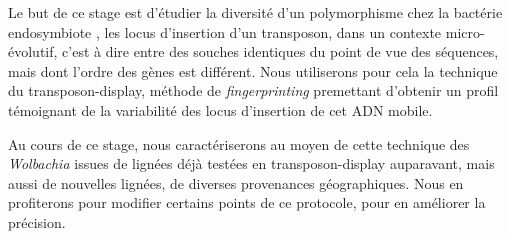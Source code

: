 Le but de ce stage est d'étudier la diversité d'un polymorphisme chez la
bactérie endosymbiote , les locus d'insertion d'un transposon,
dans un contexte micro-évolutif, c'est à dire entre des souches identiques du
point de vue des séquences, mais dont l'ordre des gènes est différent.
Nous utiliserons pour cela la technique du transposon-display, méthode de
\textit{fingerprinting} premettant d'obtenir un profil témoignant de la
variabilité des locus d'insertion de cet ADN mobile.

Au cours de ce stage, nous caractériserons au moyen de cette technique des
\textit{Wolbachia} issues de lignées déjà testées en transposon-display
auparavant, mais aussi de nouvelles lignées, de diverses provenances
géographiques. Nous en profiterons pour modifier certains points de ce
protocole, pour en améliorer la précision.
